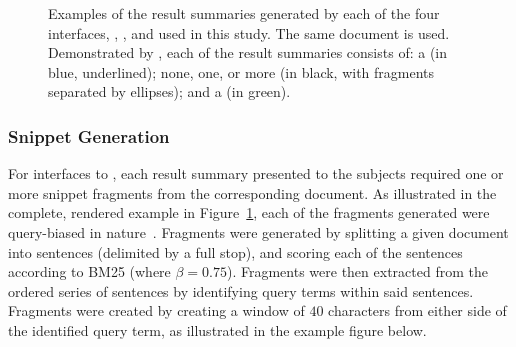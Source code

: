 \begin{figure}[t!]
    \centering
    \caption[Examples of result summaries across experimental interfaces]{Examples of the result summaries generated by each of the four interfaces, , ,  and  used in this study. The same document is used. Demonstrated by \searchlogo, each of the result summaries consists of: a  (in blue, underlined); none, one, or more  (in black, with fragments separated by ellipses); and a  (in green).}
    \label{fig:interface_snippets}
\end{figure}

\subsubsection{Snippet Generation}\label{sec:snippets:method:snippets}
For interfaces  to , each result summary presented to the subjects required one or more snippet fragments from the corresponding document. As illustrated in the complete, rendered example in Figure~\ref{fig:interface_snippets}, each of the fragments generated were query-biased in nature~\citep{tombros1998query_biased}. Fragments were generated by splitting a given document into sentences (delimited by a full stop), and scoring each of the sentences according to BM25 (where $\beta=0.75$). Fragments were then extracted from the ordered series of sentences by identifying query terms within said sentences. Fragments were created by creating a window of $40$ characters from either side of the identified query term, as illustrated in the example figure below.

\begin{figure}[h]
    \centering
    \vspace{4mm}
    \label{fig:fragment_example}
    \vspace{-5mm}
\end{figure}

